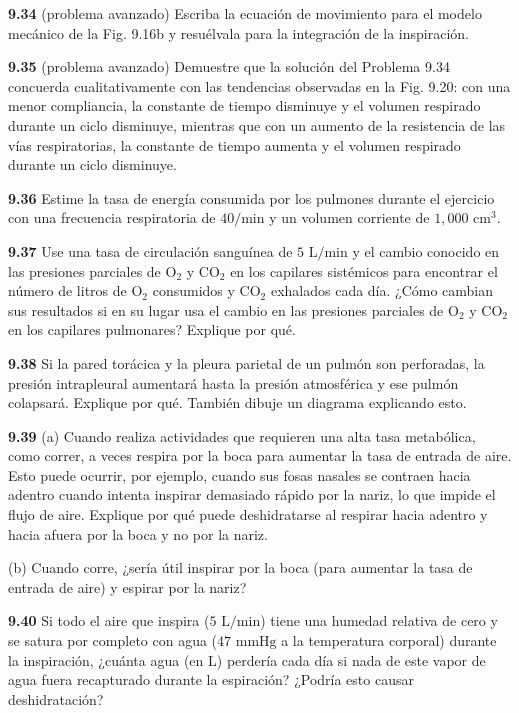 \documentclass[12pt]{book}
\begin{document}
\noindent \textbf{9.34} (problema avanzado) Escriba la ecuación de movimiento para el modelo mecánico de la Fig. 9.16b y resuélvala para la integración de la inspiración.

\noindent \textbf{9.35} (problema avanzado) Demuestre que la solución del Problema 9.34 concuerda cualitativamente con las tendencias observadas en la Fig. 9.20: con una menor compliancia, la constante de tiempo disminuye y el volumen respirado durante un ciclo disminuye, mientras que con un aumento de la resistencia de las vías respiratorias, la constante de tiempo aumenta y el volumen respirado durante un ciclo disminuye.

\noindent \textbf{9.36} Estime la tasa de energía consumida por los pulmones durante el ejercicio con una frecuencia respiratoria de $40/\text{min}$ y un volumen corriente de $1{,}000\text{ cm}^3$.

\noindent \textbf{9.37} Use una tasa de circulación sanguínea de $5\text{ L/min}$ y el cambio conocido en las presiones parciales de $\text{O}_2$ y $\text{CO}_2$ en los capilares sistémicos para encontrar el número de litros de $\text{O}_2$ consumidos y $\text{CO}_2$ exhalados cada día. ¿Cómo cambian sus resultados si en su lugar usa el cambio en las presiones parciales de $\text{O}_2$ y $\text{CO}_2$ en los capilares pulmonares? Explique por qué.


\noindent \textbf{9.38} Si la pared torácica y la pleura parietal de un pulmón son perforadas, la presión intrapleural aumentará hasta la presión atmosférica y ese pulmón colapsará. Explique por qué. También dibuje un diagrama explicando esto.

\noindent \textbf{9.39} (a) Cuando realiza actividades que requieren una alta tasa metabólica, como correr, a veces respira por la boca para aumentar la tasa de entrada de aire. Esto puede ocurrir, por ejemplo, cuando sus fosas nasales se contraen hacia adentro cuando intenta inspirar demasiado rápido por la nariz, lo que impide el flujo de aire. Explique por qué puede deshidratarse al respirar hacia adentro y hacia afuera por la boca y no por la nariz.
\par\noindent (b) Cuando corre, ¿sería útil inspirar por la boca (para aumentar la tasa de entrada de aire) y espirar por la nariz?

\noindent \textbf{9.40} Si todo el aire que inspira ($5\text{ L/min}$) tiene una humedad relativa de cero y se satura por completo con agua ($47\text{ mmHg}$ a la temperatura corporal) durante la inspiración, ¿cuánta agua (en $\text{L}$) perdería cada día si nada de este vapor de agua fuera recapturado durante la espiración? ¿Podría esto causar deshidratación?
\end{document}

